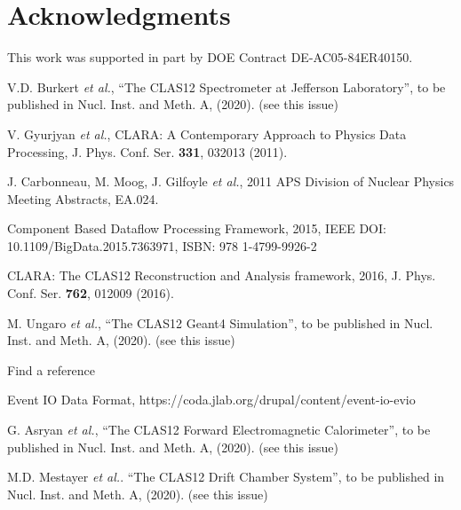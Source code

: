 \documentclass[3p,times,twocolumn]{elsarticle}
\begin{document}
\tableofcontents




















\section{Acknowledgments}

This work was supported in part by DOE Contract DE-AC05-84ER40150.

\begin{thebibliography}{99}

V.D. Burkert {\it et al.}, ``The CLAS12 Spectrometer at Jefferson Laboratory'', to be published in Nucl.
Inst. and Meth. A, (2020). (see this issue)

V. Gyurjyan {\it et al.}, CLARA: A Contemporary Approach to Physics Data Processing, J. Phys. Conf. Ser.
{\bf 331}, 032013 (2011).

J. Carbonneau, M. Moog,  J. Gilfoyle {\it et al.}, 2011 APS Division of Nuclear Physics Meeting Abstracts, EA.024.

Component Based Dataflow Processing Framework, 2015, IEEE DOI: 10.1109/BigData.2015.7363971,
ISBN: 978 1-4799-9926-2

CLARA: The CLAS12 Reconstruction and Analysis framework, 2016, J. Phys. Conf. Ser. {\bf 762}, 012009 (2016).

M. Ungaro {\it et al.},   ``The CLAS12 Geant4 Simulation'', to be published in Nucl.
Inst. and Meth. A, (2020). (see this issue)

Find a reference

Event IO Data Format,
https://coda.jlab.org/drupal/content/event-io-evio

G. Asryan {\it et al.}, ``The CLAS12 Forward Electromagnetic Calorimeter'', to be published in Nucl.
Inst. and Meth. A, (2020). (see this issue)

M.D. Mestayer {\it et al.}. ``The CLAS12 Drift Chamber System'', to be published in Nucl. Inst. and
Meth. A, (2020). (see this issue)


\end{thebibliography}
\end{document}
